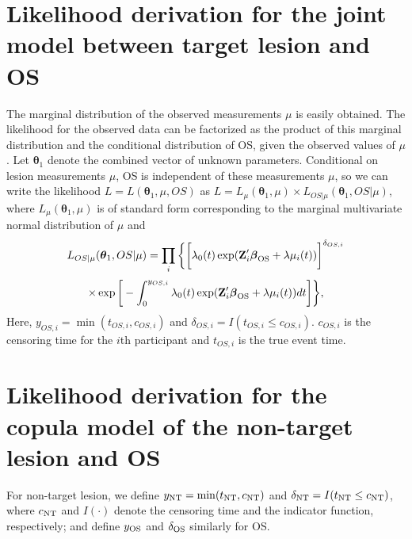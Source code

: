 \documentclass[12pt]{article}
\begin{document}



\newpage
\section{Likelihood derivation for the joint model between target lesion and OS}
The marginal distribution of the observed measurements $\mu$ is easily obtained. The likelihood for the observed data can be factorized as the product of this marginal distribution and the conditional distribution of OS, given the observed values of $\mu$. Let $\boldsymbol{\theta}_1$ denote the combined vector of unknown parameters. Conditional on lesion measurements $\mu$, OS is independent of these measurements $\mu$, so we can write the likelihood $L=L(\boldsymbol{\theta}_1, \mu, OS)$ as
$L=L_{\mu}(\boldsymbol{\theta}_1,\mu)  \times L_{OS| \mu}(\boldsymbol{\theta}_1,OS|\mu)
$,
where $L_{\mu}(\boldsymbol{\theta}_1,\mu)$ is of standard form corresponding to the marginal multivariate normal distribution of $\mu$ and
$$
L_{OS|\mu}(\boldsymbol{\theta}_1, OS|\mu)=\prod_i \bigg\{ \bigg[\lambda_0 (t) \exp(\textbf{Z}_i' \boldsymbol{\beta}_{\rm OS}+\lambda \mu_{i}(t)) \bigg]^{\delta_{OS,i}} 
$$
$$\times \exp \bigg[ -\int_0^{y_{OS,i}} \lambda_0(t) \exp(\textbf{Z}_i' \boldsymbol{\beta}_{\rm OS}+\lambda \mu_{i}(t))dt\bigg]\bigg\},
$$
Here, $y_{OS,i}=\min(t_{OS,i},c_{OS,i})$ and $\delta_{OS,i}=I(t_{OS,i}\leq c_{OS,i})$. $c_{OS,i}$ is the censoring time for the $i$th participant and $t_{OS,i}$ is the true event time.


\newpage
\section{Likelihood derivation for the copula model of the non-target lesion and OS}
For non-target lesion, we define $y_{\rm NT}=\mathrm{min}(t_{\rm NT}, c_{\rm NT})$ and
$\delta_{\rm NT}=I(t_{\rm NT} \le c_{\rm NT})$,
where $c_{\rm NT}$ and $I(\cdot)$ denote the censoring time and the indicator function,
respectively; and define $y_{\rm OS}$ and $\delta_{\rm OS}$ similarly for OS.
\end{document}
